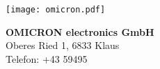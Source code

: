 \begin{figure}[H]
  \centering
  \texttt{[image: omicron.pdf]}
  \caption*{\textbf{OMICRON electronics GmbH}\\ Oberes Ried 1, 6833 Klaus\\ Telefon: +43 59495}
\end{figure}